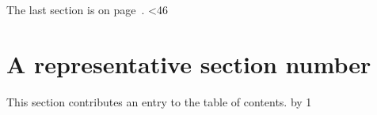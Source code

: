 \documentclass{article}
\begin{document}
\tableofcontents
The last section is on page~\pageref{section:45}.
\newcount\sectionnumber
{}
\loop\ifnum\sectionnumber<46
  \section{A representative section number \the\sectionnumber}
  \label{section:\the\sectionnumber}
  This section contributes an entry to the table of contents.
  \advance\sectionnumber by 1
\repeat
\end{document}
